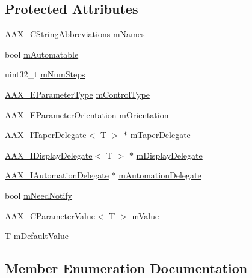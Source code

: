 \subsection*{Protected Attributes}
\begin{DoxyCompactItemize}
\item 
\mbox{\hyperlink{a01577}{A\+A\+X\+\_\+\+C\+String\+Abbreviations}} \mbox{\hyperlink{a01537_a13b20ef8912e57943e7c878e4d7ccc99}{m\+Names}}
\item 
bool \mbox{\hyperlink{a01537_af80c7fdf0e67c6e0cbd7a12f1970cd77}{m\+Automatable}}
\item 
uint32\+\_\+t \mbox{\hyperlink{a01537_a4502950e934f54b8db383a5349763548}{m\+Num\+Steps}}
\item 
\mbox{\hyperlink{a00491_a4cd0f189daa9a60cf36883c56344bb2e}{A\+A\+X\+\_\+\+E\+Parameter\+Type}} \mbox{\hyperlink{a01537_a117275f17ec1798506e64f5bbc3618f9}{m\+Control\+Type}}
\item 
\mbox{\hyperlink{a00491_a52f91d1c14aa5dceedabfb9d2de31bf0}{A\+A\+X\+\_\+\+E\+Parameter\+Orientation}} \mbox{\hyperlink{a01537_a0f0d01bd07e1a7ba321f23f632556145}{m\+Orientation}}
\item 
\mbox{\hyperlink{a01881}{A\+A\+X\+\_\+\+I\+Taper\+Delegate}}$<$ T $>$ $\ast$ \mbox{\hyperlink{a01537_ab2afe4e2e11cf18e4f9745fdc516ff91}{m\+Taper\+Delegate}}
\item 
\mbox{\hyperlink{a01801}{A\+A\+X\+\_\+\+I\+Display\+Delegate}}$<$ T $>$ $\ast$ \mbox{\hyperlink{a01537_af4020af64945013894851086e0bc33e2}{m\+Display\+Delegate}}
\item 
\mbox{\hyperlink{a01773}{A\+A\+X\+\_\+\+I\+Automation\+Delegate}} $\ast$ \mbox{\hyperlink{a01537_a255a10e4999648d7b0cd84909b2525ba}{m\+Automation\+Delegate}}
\item 
bool \mbox{\hyperlink{a01537_a3ad7bb33bf9b147a155c64455f25bf20}{m\+Need\+Notify}}
\item 
\mbox{\hyperlink{a01533}{A\+A\+X\+\_\+\+C\+Parameter\+Value}}$<$ T $>$ \mbox{\hyperlink{a01537_a039040b844bda418b110f38016757dd3}{m\+Value}}
\item 
T \mbox{\hyperlink{a01537_a1ecf6a063aa9c4335470cad963125ebb}{m\+Default\+Value}}
\end{DoxyCompactItemize}


\subsection{Member Enumeration Documentation}
\mbox{\label{a01537_a04704f13b4367b9e7430217d06c5e4bd}} 
